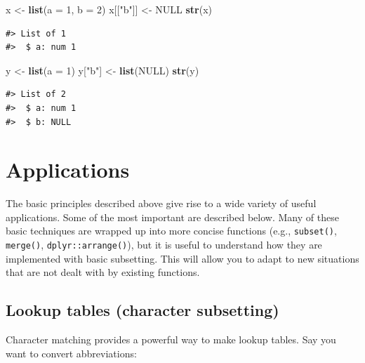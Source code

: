 \documentclass[]{book}
\newenvironment{Shaded}{\begin{snugshade}}{\end{snugshade}}
\newcommand{\KeywordTok}[1]{\textcolor[rgb]{0.13,0.29,0.53}{\textbf{#1}}}
\newcommand{\DataTypeTok}[1]{\textcolor[rgb]{0.13,0.29,0.53}{#1}}
\newcommand{\DecValTok}[1]{\textcolor[rgb]{0.00,0.00,0.81}{#1}}
\newcommand{\StringTok}[1]{\textcolor[rgb]{0.31,0.60,0.02}{#1}}
\newcommand{\OtherTok}[1]{\textcolor[rgb]{0.56,0.35,0.01}{#1}}
\newcommand{\NormalTok}[1]{#1}
\theoremstyle{definition}
\theoremstyle{definition}
\theoremstyle{definition}
\theoremstyle{remark}
\begin{document}
\begin{Shaded}
\begin{Highlighting}[]
\NormalTok{x <-}\StringTok{ }\KeywordTok{list}\NormalTok{(}\DataTypeTok{a =} \DecValTok{1}\NormalTok{, }\DataTypeTok{b =} \DecValTok{2}\NormalTok{)}
\NormalTok{x[[}\StringTok{"b"}\NormalTok{]] <-}\StringTok{ }\OtherTok{NULL}
\KeywordTok{str}\NormalTok{(x)}
\end{Highlighting}
\end{Shaded}

\begin{verbatim}
#> List of 1
#>  $ a: num 1
\end{verbatim}

\begin{Shaded}
\begin{Highlighting}[]
\NormalTok{y <-}\StringTok{ }\KeywordTok{list}\NormalTok{(}\DataTypeTok{a =} \DecValTok{1}\NormalTok{)}
\NormalTok{y[}\StringTok{"b"}\NormalTok{] <-}\StringTok{ }\KeywordTok{list}\NormalTok{(}\OtherTok{NULL}\NormalTok{)}
\KeywordTok{str}\NormalTok{(y)}
\end{Highlighting}
\end{Shaded}

\begin{verbatim}
#> List of 2
#>  $ a: num 1
#>  $ b: NULL
\end{verbatim}

\section{Applications}\label{applications}

The basic principles described above give rise to a wide variety of
useful applications. Some of the most important are described below.
Many of these basic techniques are wrapped up into more concise
functions (e.g., \texttt{subset()}, \texttt{merge()},
\texttt{dplyr::arrange()}), but it is useful to understand how they are
implemented with basic subsetting. This will allow you to adapt to new
situations that are not dealt with by existing functions.

\subsection{Lookup tables (character
subsetting)}\label{lookup-tables-character-subsetting}

Character matching provides a powerful way to make lookup tables. Say
you want to convert abbreviations:
\end{document}
